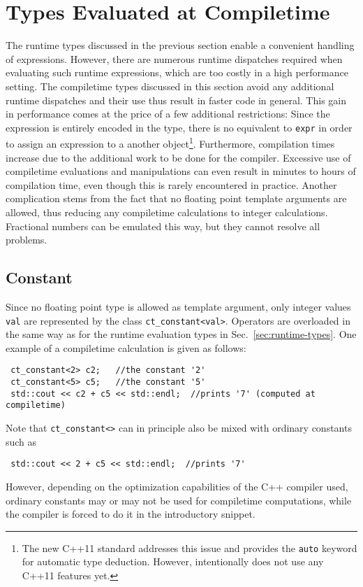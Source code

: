 \section{Types Evaluated at Compiletime} \label{sec:compiletime-types}
The runtime types discussed in the previous section enable a convenient handling of expressions.
However, there are numerous runtime dispatches required when evaluating such runtime expressions, which are too costly in a high performance setting.
The compiletime types discussed in this section avoid any additional runtime dispatches and their use thus result in faster code in general.
This gain in performance comes at the price of a few additional restrictions:
Since the expression is entirely encoded in the type, there is no equivalent to \lstinline|expr| in order to assign an expression to a another object\footnote{The new C++11 standard addresses this issue and provides the \lstinline|auto| keyword for automatic type deduction. However, {\ViennaMath} intentionally does not use any C++11 features yet.}.
Furthermore, compilation times increase due to the additional work to be done for the compiler.
Excessive use of compiletime evaluations and manipulations can even result in minutes to hours of compilation time, even though this is rarely encountered in practice.
Another complication stems from the fact that no floating point template arguments are allowed, thus reducing any compiletime calculations to integer calculations.
Fractional numbers can be emulated this way, but they cannot resolve all problems.

 \subsection{Constant}
Since no floating point type is allowed as template argument, only integer values \lstinline|val| are represented by the class \lstinline|ct_constant<val>|.
Operators are overloaded in the same way as for the runtime evaluation types in Sec.~\ref{sec:runtime-types}. One example of a compiletime calculation is given as follows:
\begin{lstlisting}
 ct_constant<2> c2;   //the constant '2'
 ct_constant<5> c5;   //the constant '5'
 std::cout << c2 + c5 << std::endl;  //prints '7' (computed at compiletime)
\end{lstlisting}
Note that \lstinline|ct_constant<>| can in principle also be mixed with ordinary constants such as
\begin{lstlisting}
 std::cout << 2 + c5 << std::endl;  //prints '7'
\end{lstlisting}
However, depending on the optimization capabilities of the C++ compiler used, ordinary constants may or may not be used for compiletime computations, while the compiler is forced to do it in the introductory snippet.

